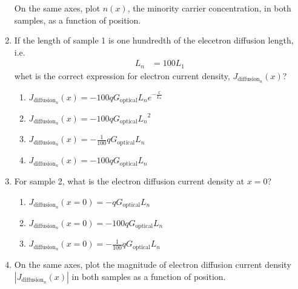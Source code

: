 \documentclass[fleqn, a4paper, 11pt, oneside]{amsart}
\theoremstyle{definition}
\theoremstyle{theorem}
\begin{document}
\begin{question}
\begin{enumerate}
			On the same axes, plot $n(x)$, the minority carrier concentration, in both samples, as a function of position.
		\item
			If the length of sample 1 is one hundredth of the elecetron diffusion length, i.e.
			\begin{align*}
				L_n & = 100 L_1
			\end{align*}
			whet is the correct expression for electron current density, $J_{\text{diffusion}_n}(x)$?
			\begin{enumerate}
				\item $J_{\text{diffusion}_n}(x) = -100 q G_{\text{optical}} L_n e^{-\frac{x}{L_n}}$
				\item $J_{\text{diffusion}_n}(x) = -100 q G_{\text{optical}} {L_n}^2$
				\item $J_{\text{diffusion}_n}(x) = -\frac{1}{100} q G_{\text{optical}} L_n$
				\item $J_{\text{diffusion}_n}(x) = -100 q G_{\text{optical}} L_n$
			\end{enumerate}
		\item
			For sample 2, what is the electron diffusion current density at $x = 0$?
			\begin{enumerate}
				\item $J_{\text{diffusion}_n}(x = 0) = -q G_{\text{optical}} L_n$
				\item $J_{\text{diffusion}_n}(x = 0) = -100 q G_{\text{optical}} L_n$
				\item $J_{\text{diffusion}_n}(x = 0) = -\frac{1}{100} q G_{\text{optical}} L_n$
			\end{enumerate}
		\item
			On the same axes, plot the magnitude of electron diffusion current density $\left| J_{\text{diffusion}_n}(x) \right|$ in both samples as a function of position.
	\end{enumerate}
\end{question}
\end{document}
